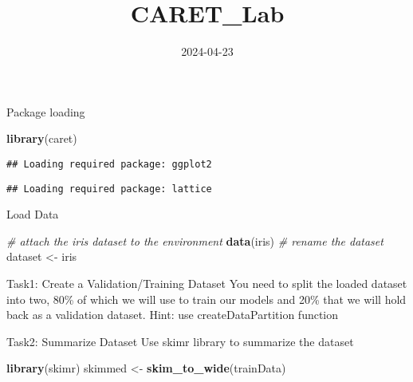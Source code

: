 \documentclass[
]{article}
\title{CARET\_Lab}
\author{}
\date{\vspace{-2.5em}2024-04-23}
\newenvironment{Shaded}{\begin{snugshade}}{\end{snugshade}}
\newcommand{\AttributeTok}[1]{\textcolor[rgb]{0.13,0.29,0.53}{#1}}
\newcommand{\CommentTok}[1]{\textcolor[rgb]{0.56,0.35,0.01}{\textit{#1}}}
\newcommand{\ConstantTok}[1]{\textcolor[rgb]{0.56,0.35,0.01}{#1}}
\newcommand{\FloatTok}[1]{\textcolor[rgb]{0.00,0.00,0.81}{#1}}
\newcommand{\FunctionTok}[1]{\textcolor[rgb]{0.13,0.29,0.53}{\textbf{#1}}}
\newcommand{\NormalTok}[1]{#1}
\newcommand{\OtherTok}[1]{\textcolor[rgb]{0.56,0.35,0.01}{#1}}
\newcommand{\SpecialCharTok}[1]{\textcolor[rgb]{0.81,0.36,0.00}{\textbf{#1}}}
\begin{document}
\maketitle

Package loading

\begin{Shaded}
\begin{Highlighting}[]
\FunctionTok{library}\NormalTok{(caret)}
\end{Highlighting}
\end{Shaded}

\begin{verbatim}
## Loading required package: ggplot2
\end{verbatim}

\begin{verbatim}
## Loading required package: lattice
\end{verbatim}

Load Data

\begin{Shaded}
\begin{Highlighting}[]
\CommentTok{\# attach the iris dataset to the environment}
\FunctionTok{data}\NormalTok{(iris)}
\CommentTok{\# rename the dataset}
\NormalTok{dataset }\OtherTok{\textless{}{-}}\NormalTok{ iris}
\end{Highlighting}
\end{Shaded}

Task1: Create a Validation/Training Dataset You need to split the loaded
dataset into two, 80\% of which we will use to train our models and 20\%
that we will hold back as a validation dataset. Hint: use
createDataPartition function

\begin{Shaded}
\end{Shaded}

Task2: Summarize Dataset Use skimr library to summarize the dataset

\begin{Shaded}
\begin{Highlighting}[]
\FunctionTok{library}\NormalTok{(skimr)}
\NormalTok{skimmed }\OtherTok{\textless{}{-}} \FunctionTok{skim\_to\_wide}\NormalTok{(trainData)}
\end{Highlighting}
\end{Shaded}
\end{document}
